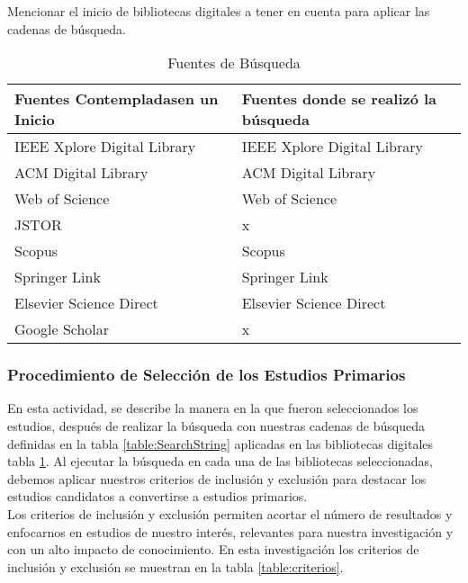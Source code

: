 \documentclass[•]{article}
\begin{document}
Mencionar el inicio de bibliotecas digitales a tener en cuenta para aplicar las cadenas de búsqueda.

\begin{table}
    \begin{center}
        \caption{Fuentes de Búsqueda}
        \label{table:libraries}
        \begin{tabular}{| p{3.8cm} | p{3.8cm} |}
            \toprule
            \hline
            \textbf {Fuentes Contempladasen un Inicio} &  \textbf{Fuentes donde se realizó la búsqueda}\\
            \hline
            IEEE Xplore Digital Library & IEEE Xplore Digital Library\\
            \hline
            ACM Digital Library & ACM Digital Library\\
            \hline
            Web of Science & Web of Science\\
            \hline
            JSTOR & x\\
            \hline
            Scopus & Scopus\\
            \hline
            Springer Link & Springer Link\\
            \hline
            Elsevier Science Direct & Elsevier Science Direct\\
            \hline
            Google Scholar & x\\
            \hline
        \end{tabular}
    \end{center}
\end{table}


	\subsubsection{Procedimiento de Selección de los Estudios Primarios}
	En esta actividad, se describe la manera en la que fueron seleccionados los estudios, después de realizar la búsqueda con nuestras cadenas de búsqueda definidas en la tabla \ref{table:SearchString} aplicadas en las bibliotecas digitales tabla \ref{table:libraries}. Al ejecutar la búsqueda en cada una de las bibliotecas seleccionadas, debemos aplicar nuestros criterios de inclusión y exclusión para destacar los estudios candidatos a convertirse a estudios primarios.\\
	Los criterios de inclusión y exclusión permiten acortar el número de resultados y enfocarnos en estudios de nuestro interés, relevantes para nuestra investigación y con un alto impacto de conocimiento. En esta investigación los criterios de inclusión y exclusión se muestran en la tabla \ref{table:criterios}.
	
\end{document}
